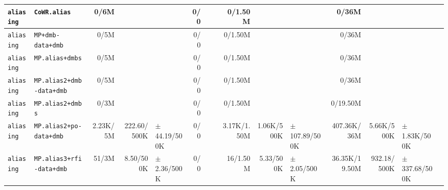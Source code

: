 \begin{tabular}{l l  | r r l | r r l | r r l | r r l l}
    \verb|aliasing| &                                          \verb|CoWR.alias| &           0/6M &                       &                   &            0/0 &                       &                 &        0/1.50M &                       &                   &          0/36M &                       &                   & \\ \hline 
    \verb|aliasing| &                                     \verb|MP+dmb-data+dmb| &           0/5M &                       &                   &            0/0 &                       &                 &        0/1.50M &                       &                   &          0/36M &                       &                   & \\ \hline 
    \verb|aliasing| &                                       \verb|MP.alias+dmbs| &           0/5M &                       &                   &            0/0 &                       &                 &        0/1.50M &                       &                   &          0/36M &                       &                   & \\ \hline 
    \verb|aliasing| &                              \verb|MP.alias2+dmb-data+dmb| &           0/5M &                       &                   &            0/0 &                       &                 &        0/1.50M &                       &                   &          0/36M &                       &                   & \\ \hline 
    \verb|aliasing| &                                      \verb|MP.alias2+dmbs| &           0/3M &                       &                   &            0/0 &                       &                 &        0/1.50M &                       &                   &       0/19.50M &                       &                   & \\ \hline 
    \verb|aliasing| &                               \verb|MP.alias2+po-data+dmb| &       2.23K/5M &           222.60/500K &  $\pm$ 44.19/500K &            0/0 &                       &                 &    3.17K/1.50M &            1.06K/500K & $\pm$ 107.89/500K &    407.36K/36M &            5.66K/500K &  $\pm$ 1.83K/500K & \\ \hline 
    \verb|aliasing| &                              \verb|MP.alias3+rfi-data+dmb| &          51/3M &             8.50/500K &   $\pm$ 2.36/500K &            0/0 &                       &                 &       16/1.50M &             5.33/500K &   $\pm$ 2.05/500K &  36.35K/19.50M &           932.18/500K & $\pm$ 337.68/500K & \\ \hline 

\end{tabular}
